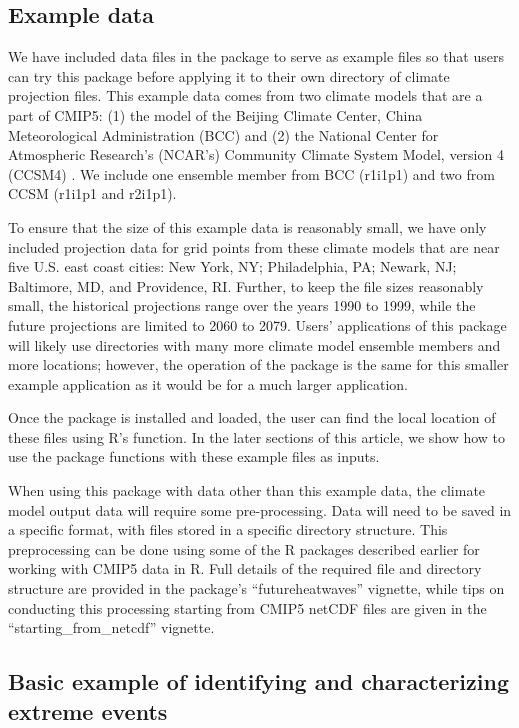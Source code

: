 \subsection{Example data}\label{example-data}

We have included data files in the package to serve as example files so
that users can try this package before applying it to their own
directory of climate projection files. This example data comes from two
climate models that are a part of CMIP5: (1) the model of the Beijing
Climate Center, China Meteorological Administration (BCC)
\citep{xin2013introduction} and (2) the National Center for Atmospheric
Research's (NCAR's) Community Climate System Model, version 4 (CCSM4)
\citep{gent2011community}. We include one ensemble member from BCC
(r1i1p1) and two from CCSM (r1i1p1 and r2i1p1).

To ensure that the size of this example data is reasonably small, we
have only included projection data for grid points from these climate
models that are near five U.S. east coast cities: New York, NY;
Philadelphia, PA; Newark, NJ; Baltimore, MD, and Providence, RI.
Further, to keep the file sizes reasonably small, the historical
projections range over the years 1990 to 1999, while the future
projections are limited to 2060 to 2079. Users' applications of this
package will likely use directories with many more climate model
ensemble members and more locations; however, the operation of the
package is the same for this smaller example application as it would be
for a much larger application.

Once the  package is installed and loaded, the user
can find the local location of these files using R's 
function. In the later sections of this article, we show how to use the
package functions with these example files as inputs.

When using this package with data other than this example data, the
climate model output data will require some pre-processing. Data will
need to be saved in a specific format, with files stored in a specific
directory structure. This preprocessing can be done using some of the R
packages described earlier for working with CMIP5 data in R. Full
details of the required file and directory structure are provided in the
package's ``futureheatwaves'' vignette, while tips on conducting this
processing starting from CMIP5 netCDF files are given in the
``starting\_from\_netcdf'' vignette.

\subsection{Basic example of identifying and characterizing extreme
events}\label{basic-example-of-identifying-and-characterizing-extreme-events}

